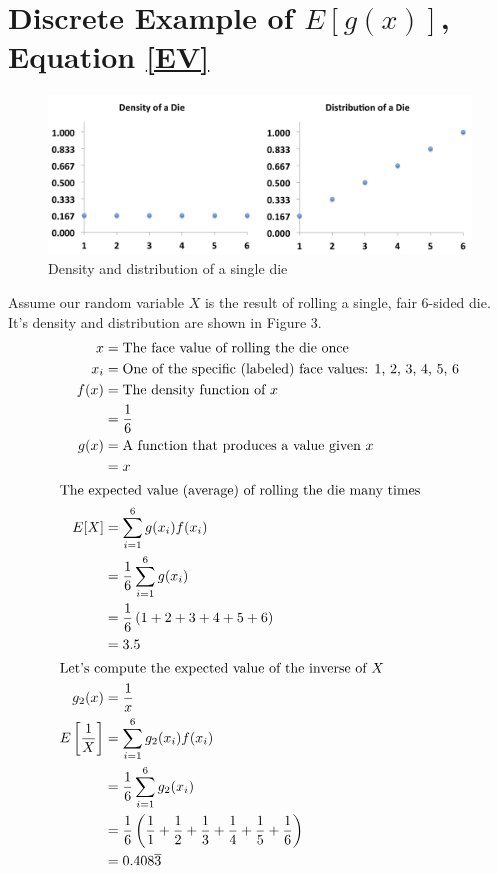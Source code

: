 %
\section{Discrete Example of \texorpdfstring{$E[g(x)]$}{E[g(x)]}, Equation \ref{EV}} %
\begin{figure}[b]
\begin{center}
\includegraphics[width=0.8\linewidth]{figures/DieDenDist.png}
\end{center}
\caption{Density and distribution of a single die}
\end{figure}
Assume our random variable $X$ is the result of rolling a single, fair 6-sided die.  
It's density and distribution are shown in Figure 3.
\begin{align*}
x    &= \text{The face value of rolling the die once} \\
x_i  &= \text{One of the specific (labeled) face values: 1, 2, 3, 4, 5, 6} \\
f(x) &= \text{The density function of $x$} \\
     &= \frac{1}{6} \\
g(x) &= \text{A function that produces a value given $x$} \\
     &= x \\
\shortintertext{The expected value (average) of rolling the die many times}
E[X] &= \sum_{i=1}^6 g(x_i)f(x_i) \\
     &= \frac{1}{6}\sum_{i=1}^6 g(x_i) \\
     &= \frac{1}{6}\left( 1 + 2 + 3 + 4 + 5 + 6\right) \\
     &= 3.5 \\
\shortintertext{Let's compute the expected value of the inverse of $X$} 
g_2(x) &= \frac{1}{x} \\
E\left[\frac{1}{X}\right] &= \sum_{i=1}^6 g_2(x_i)f(x_i) \\
                         &= \frac{1}{6}\sum_{i=1}^6 g_2(x_i) \\
                         &= \frac{1}{6}\left( \frac{1}{1} + \frac{1}{2} + \frac{1}{3} + \frac{1}{4} + \frac{1}{5} + \frac{1}{6}\right) \\
                         &= 0.408\overline{3} \\
\end{align*}
